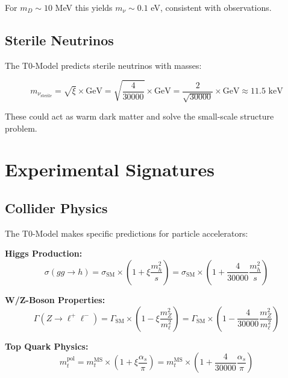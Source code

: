 \documentclass[12pt,a4paper]{report}
\newcommand{\xipar}{\xi}      %
\begin{document}
	For $m_D \sim 10$ MeV this yields $m_\nu \sim 0.1$ eV, consistent with observations.
	
	\subsection{Sterile Neutrinos}\label{subsec:sterile_neutrinos}
	
	The T0-Model predicts sterile neutrinos with masses:
	
	\begin{equation}
		m_{\nu_\text{sterile}} = \sqrt{\xipar} \times \text{GeV} = \sqrt{\frac{4}{30000}} \times \text{GeV} = \frac{2}{\sqrt{30000}} \times \text{GeV} \approx 11.5 \text{ keV}
	\end{equation}
	
	These could act as warm dark matter and solve the small-scale structure problem.
	
	\section{Experimental Signatures}\label{sec:experimental_signatures}
	
	\subsection{Collider Physics}\label{subsec:collider_physics}
	
	The T0-Model makes specific predictions for particle accelerators:
	
	\textbf{Higgs Production:}
	\begin{equation}
		\sigma(gg \to h) = \sigma_{\text{SM}} \times \left(1 + \xipar \frac{m_h^2}{s}\right) = \sigma_{\text{SM}} \times \left(1 + \frac{4}{30000} \frac{m_h^2}{s}\right)
	\end{equation}
	
	\textbf{W/Z-Boson Properties:}
	\begin{equation}
		\Gamma(Z \to \ell^+ \ell^-) = \Gamma_{\text{SM}} \times \left(1 - \xipar \frac{m_Z^2}{m_\ell^2}\right) = \Gamma_{\text{SM}} \times \left(1 - \frac{4}{30000} \frac{m_Z^2}{m_\ell^2}\right)
	\end{equation}
	
	\textbf{Top Quark Physics:}
	\begin{equation}
		m_t^{\text{pol}} = m_t^{\text{MS}} \times \left(1 + \xipar \frac{\alpha_s}{\pi}\right) = m_t^{\text{MS}} \times \left(1 + \frac{4}{30000} \frac{\alpha_s}{\pi}\right)
	\end{equation}
	
\end{document}
